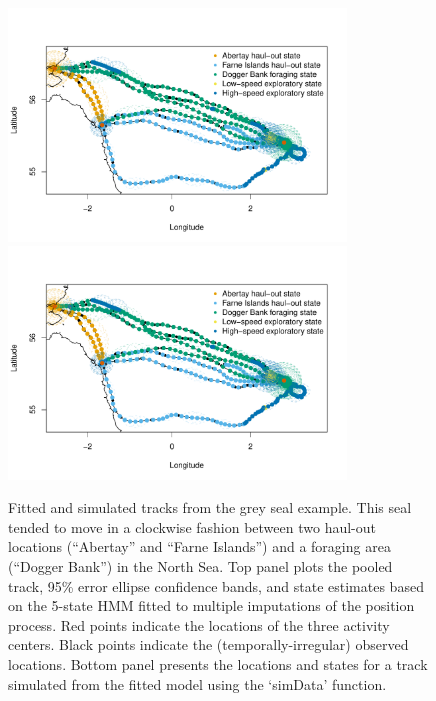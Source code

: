 \documentclass[12pt]{article}
\begin{document}
\begin{figure}[htbp]
  \centering
    \includegraphics[width=0.8\textwidth,page=1]{plot_greySealResults2}\\
    \includegraphics[width=0.8\textwidth,page=2]{plot_greySealResults2}
  \caption{Fitted and simulated tracks from the grey seal example. This seal tended to move in a clockwise fashion between two haul-out locations (``Abertay'' and ``Farne Islands'') and a foraging area (``Dogger Bank'') in the North Sea. Top panel plots the pooled track, 95\% error ellipse confidence bands, and state estimates based on the 5-state HMM fitted to multiple imputations of the position process. Red points indicate the locations of the three activity centers. Black points indicate the (temporally-irregular) observed locations. Bottom panel presents the locations and states for a track simulated from the fitted model using the `simData' function.}
  \label{fig:greySealStateSims}
\end{figure}
\end{document}
